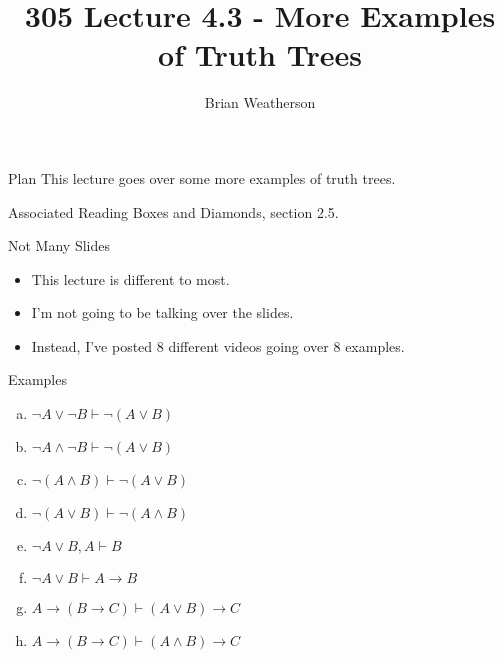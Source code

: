 \documentclass[
  ignorenonframetext,
]{beamer}
\title{305 Lecture 4.3 - More Examples of Truth Trees}
\author{Brian Weatherson}
\date{}
\providecommand{\tightlist}{%
  \setlength{\itemsep}{0pt}\setlength{\parskip}{0pt}}
\renewcommand{\,}{\text{, }}
\begin{document}
\frame{\titlepage}

\begin{frame}{Plan}
\protect\hypertarget{plan}{}
This lecture goes over some more examples of truth trees.
\end{frame}

\begin{frame}{Associated Reading}
\protect\hypertarget{associated-reading}{}
Boxes and Diamonds, section 2.5.
\end{frame}

\begin{frame}{Not Many Slides}
\protect\hypertarget{not-many-slides}{}
\begin{itemize}
\tightlist
\item
  This lecture is different to most.
\item
  I'm not going to be talking over the slides.
\item
  Instead, I've posted 8 different videos going over 8 examples.
\end{itemize}
\end{frame}

\begin{frame}{Examples}
\protect\hypertarget{examples}{}
\begin{enumerate}
[a.]
\tightlist
\item
  \(\neg A \vee \neg B \vdash \neg (A \vee B)\)
\item
  \(\neg A \wedge \neg B \vdash \neg (A \vee B)\)
\item
  \(\neg (A \wedge B) \vdash \neg (A \vee B)\)
\item
  \(\neg (A \vee B) \vdash \neg (A \wedge B)\)
\item
  \(\neg A \vee B, A \vdash B\)
\item
  \(\neg A \vee B \vdash A \rightarrow B\)
\item
  \(A \rightarrow (B \rightarrow C) \vdash (A \vee B) \rightarrow C\)
\item
  \(A \rightarrow (B \rightarrow C) \vdash (A \wedge B) \rightarrow C\)
\end{enumerate}
\end{frame}
\end{document}
